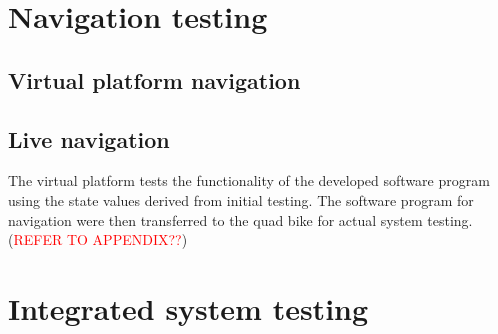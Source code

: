 \documentclass[main.tex]{subfiles}
\begin{document}
\section{Navigation testing}
\subsection{Virtual platform navigation}
\subsection{Live navigation}
The virtual platform tests the functionality of the developed software program using the state values derived from initial testing. The software program for navigation were then transferred to the quad bike for actual system testing. (\textcolor{red}{REFER TO APPENDIX??})

\section{Integrated system testing}
\end{document}
